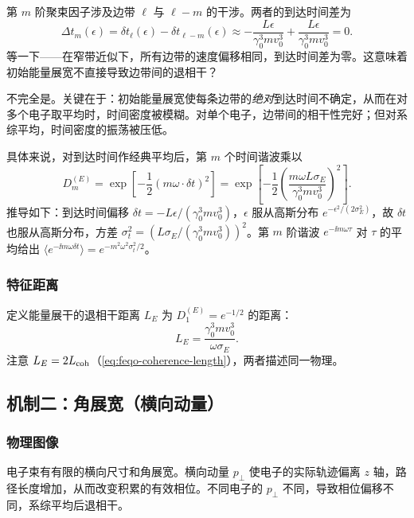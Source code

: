 第 $m$ 阶聚束因子涉及边带 $\ell$ 与 $\ell-m$ 的干涉。两者的到达时间差为
\begin{equation}
\Delta t_m(\epsilon)=\delta t_\ell(\epsilon)-\delta t_{\ell-m}(\epsilon)
\approx-\frac{L\epsilon}{\gamma_0^3 mv_0^3}+\frac{L\epsilon}{\gamma_0^3 mv_0^3}=0.
\label{eq:feqo-arrival-difference-zero}
\end{equation}
等一下——在窄带近似下，所有边带的速度偏移相同，到达时间差为零。这意味着初始能量展宽不直接导致边带间的退相干？

不完全是。关键在于：初始能量展宽使每条边带的\emph{绝对}到达时间不确定，从而在对多个电子取平均时，时间密度被模糊。对单个电子，边带间的相干性完好；但对系综平均，时间密度的振荡被压低。

具体来说，对到达时间作经典平均后，第 $m$ 个时间谐波乘以
\begin{equation}
D_m^{(E)}=\exp\!\left[-\frac{1}{2}(m\omega\cdot\delta t)^2\right]
=\exp\!\left[-\frac{1}{2}\left(\frac{m\omega L\sigma_E}{\gamma_0^3mv_0^3}\right)^2\right].
\label{eq:feqo-energy-damping}
\end{equation}
推导如下：到达时间偏移 $\delta t=-L\epsilon/(\gamma_0^3mv_0^3)$，$\epsilon$ 服从高斯分布 $e^{-\epsilon^2/(2\sigma_E^2)}$，故 $\delta t$ 也服从高斯分布，方差 $\sigma_t^2=(L\sigma_E/(\gamma_0^3mv_0^3))^2$。第 $m$ 阶谐波 $e^{-\ii m\omega\tau}$ 对 $\tau$ 的平均给出 $\langle e^{-\ii m\omega\delta t}\rangle=e^{-m^2\omega^2\sigma_t^2/2}$。

\subsubsection{特征距离}

定义能量展干的退相干距离 $L_E$ 为 $D_1^{(E)}=e^{-1/2}$ 的距离：
\begin{equation}
L_E=\frac{\gamma_0^3mv_0^3}{\omega\sigma_E}.
\label{eq:feqo-LE-def}
\end{equation}
注意 $L_E=2L_{\rm coh}$（\cref{eq:feqo-coherence-length}），两者描述同一物理。

\subsection{机制二：角展宽（横向动量）}

\subsubsection{物理图像}

电子束有有限的横向尺寸和角展宽。横向动量 $p_\perp$ 使电子的实际轨迹偏离 $z$ 轴，路径长度增加，从而改变积累的有效相位。不同电子的 $p_\perp$ 不同，导致相位偏移不同，系综平均后退相干。

